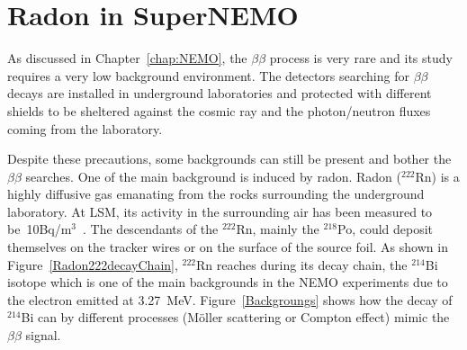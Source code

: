 \documentclass[main.tex]{subfiles}
\begin{document}
\chapter{Radon in SuperNEMO}\label{chap:Radon}

 





\NI As discussed in Chapter~\ref{chap:NEMO}, the $\beta\beta$ process is very rare and its study requires a very low background environment. The detectors searching for $\beta\beta$ decays are installed in underground laboratories and protected with different shields to be sheltered against the cosmic ray and the photon/neutron fluxes coming from the laboratory.


\bigskip


\NI Despite these precautions, some backgrounds can still be present and bother the $\beta\beta$ searches. One of the main background is induced by radon. Radon ($^{\text{222}}$Rn) is a highly diffusive gas emanating from the rocks surrounding the underground laboratory. At LSM, its activity in the surrounding air has been measured to be~10Bq/m$^\text{3}$~\cite{RadonLSM}. The descendants of the $^{\text{222}}$Rn, mainly the $^{\text{218}}$Po, could deposit themselves on the tracker wires or on the surface of the source foil. As shown in Figure~\ref{Radon222decayChain}, $^{\text{222}}$Rn reaches during its decay chain, the $^{\text{214}}$Bi isotope which is one of the main backgrounds in the NEMO experiments due to the electron emitted at 3.27~MeV. Figure~\ref{Backgroungs} shows how the decay of $^{\text{214}}$Bi can by different processes (Möller scattering or Compton effect) mimic the $\beta\beta$ signal. 
\end{document}
